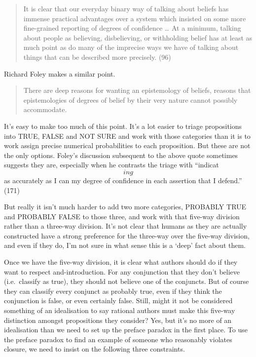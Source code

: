 \documentclass[11pt,]{book}
\begin{document}
\begin{quote}
It is clear that our everyday binary way of talking about beliefs has immense practical advantages over a system which insisted on some more fine-grained reporting of degrees of confidence \ldots{} At a minimum, talking about people as believing, disbelieving, or withholding belief has at least as much point as do many of the imprecise ways we have of talking about things that can be described more precisely. (96)
\end{quote}

Richard Foley makes a similar point.

\begin{quote}
There are deep reasons for wanting an epistemology of beliefs, reasons that epistemologies of degrees of belief by their very nature cannot possibly accommodate. \citep[ 170, my emphasis]{Foley1993}
\end{quote}

It's easy to make too much of this point. It's a lot easier to triage propositions into TRUE, FALSE and NOT SURE and work with those categories than it is to work assign precise numerical probabilities to each proposition. But these are not the only options. Foley's discussion subsequent to the above quote sometimes suggests they are, especially when he contrasts the triage with ``indicat\[ing\] as accurately as I can my degree of confidence in each assertion that I defend.'' (171)

But really it isn't much harder to add two more categories, PROBABLY TRUE and PROBABLY FALSE to those three, and work with that five-way division rather than a three-way division. It's not clear that humans as they are actually constructed have a strong preference for the three-way over the five-way division, and even if they do, I'm not sure in what sense this is a `deep' fact about them.

Once we have the five-way division, it is clear what authors should do if they want to respect and-introduction. For any conjunction that they don't believe (i.e.~classify as true), they should not believe one of the conjuncts. But of course they can classify every conjunct as probably true, even if they think the conjunction is false, or even certainly false. Still, might it not be considered something of an idealisation to say rational authors must make this five-way distinction amongst
propositions they consider? Yes, but it's no more of an idealisation than we need to set up the preface paradox in the first place. To use the preface paradox to find an example of someone who reasonably violates closure, we need to insist on the following three constraints.
\end{document}
